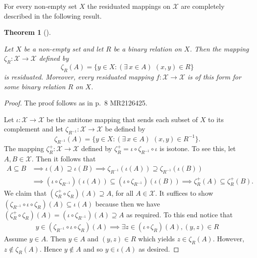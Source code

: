 \documentclass[
  letterpaper,
  10pt,
  reqno,
  twopage,
  openany]{book}
\theoremstyle{plain}
\theoremstyle{definition}
\theoremstyle{definition}
\theoremstyle{definition}
\theoremstyle{plain}
\theoremstyle{plain}
\newtheorem{theorem}{Theorem}[chapter]
\theoremstyle{remark}
\begin{document}
For every non-empty set \(X\) the residuated mappings on \(\mathcal{X}\)
are completely described in the following result.

\leavevmode{}%
\begin{theorem}[]\label{thm-residuated}

Let \(X\) be a non-empty set and let \(R\) be a binary relation on
\(X\). Then the mapping \(\zeta_R :\mathcal{X}\to\mathcal{X}\) defined
by \[
\zeta_R(A)=\{y\in X : (\exists \, x\in A) \, \, (x,y)\in R\}
\] is residuated. Moreover, every residuated mapping
\(f:\mathcal{X}\to\mathcal{X}\) is of this form for some binary relation
\(R\) on \(X\).

\end{theorem}

\begin{proof}

The proof follows as in p.~8 MR2126425.

Let \(\iota : \mathcal{X} \to \mathcal{X}\) be the antitone mapping that
sends each subset of \(X\) to its complement and let
\(\zeta_{R^{-1}}:\mathcal{X} \to \mathcal{X}\) be defined by \[
\zeta_{R^{-1}}(A)=\{y\in X : (\exists \, x\in A) \, \, (x,y)\in R^{-1}\}.
\] The mapping \(\zeta_{R}^+:\mathcal{X} \to \mathcal{X}\) defined by
\(\zeta_{R}^+=\iota\circ \zeta_{R^{-1}}\circ \iota\) is isotone. To see
this, let \(A,B\in \mathcal{X}\). Then it follows that \begin{align*}
A\subseteq B & \implies \iota(A)\supseteq \iota(B) \implies \zeta_{R^{-1}}(\iota(A))\supseteq \zeta_{R^{-1}}(\iota(B)) \\
& \implies (\iota\circ \zeta_{R^{-1}})(\iota(A))\subseteq (\iota\circ \zeta_{R^{-1}})(\iota(B)) \implies \zeta^+_R(A) \subseteq \zeta^+_R(B).
\end{align*} We claim that \((\zeta_R^+\circ \zeta_R)(A)\supseteq A\),
for all \(A\in \mathcal{X}\). It suffices to show
\((\zeta_{R^{-1}}\circ \iota \circ \zeta_R)(A)\subseteq \iota(A)\)
because then we have
\((\zeta^+_R\circ \zeta_R)(A)=(\iota\circ \zeta_{R^{-1}})(A)\supseteq A\)
as required. To this end notice that \begin{align*}
y\in (\zeta_{R^{-1}}\circ \iota \circ \zeta_R)(A) \implies \exists z\in (\iota\circ \zeta_R)(A), (y,z)\in R 
\end{align*} Assume \(y\in A\). Then \(y\in A\) and \((y,z)\in R\) which
yields \(z\in \zeta_R(A)\). However, \(z\notin \zeta_R(A)\). Hence
\(y\notin A\) and so \(y\in \iota(A)\) as desired.


\end{proof}
\end{document}
